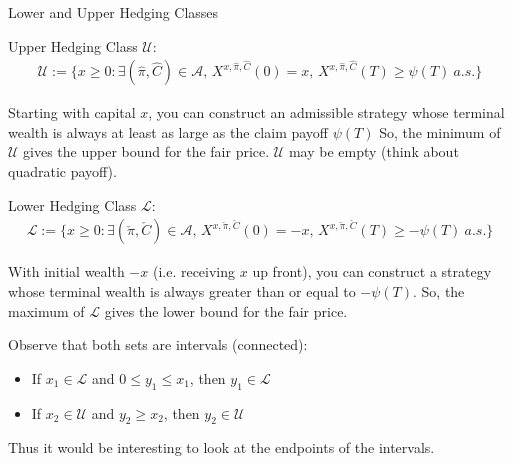 \documentclass{beamer}
\begin{document}
\begin{frame}{Lower and Upper Hedging Classes}

    {\footnotesize \footnotesize
    \par Upper Hedging Class $\mathcal{U}$:
    \begin{align*}
         \mathcal{U} := \{x \geq 0 : \exists (\hat{\pi}, \hat{C}) \in \mathcal{A}, \, X^{x,\hat{\pi},\hat{C}}(0)
          = x, \, X^{x,\hat{\pi},\hat{C}}(T) \geq \psi(T) \ a.s.\}
    \end{align*}
    \par Starting with capital $x$,
     you can construct an admissible strategy whose terminal wealth is always at least as large as the claim payoff $\psi(T)$
     So, the minimum of $\mathcal{U}$ gives the upper bound for the fair price. $\mathcal{U}$ may be empty (think about quadratic payoff).
     \vspace{1em}
     \par Lower Hedging Class $\mathcal{L}$:
     \begin{align*}
         \mathcal{L} := \{x \geq 0 : \exists (\check{\pi}, \check{C}) \in \mathcal{A}, \, X^{x,\check{\pi},\check{C}}(0) 
         = -x, \, X^{x,\check{\pi},\check{C}}(T) \geq -\psi(T) \ a.s.\}
     \end{align*}
     \par  With initial wealth $-x$ (i.e. receiving $x$ up front),
      you can construct a strategy whose terminal wealth is always greater than or equal to $-\psi(T)$. 
      So, the maximum of $\mathcal{L}$ gives the lower bound for the fair price.
      \vspace{1em}
      \par Observe that both sets are intervals (connected):
     \begin{itemize}
        \item If $x_1 \in \mathcal{L}$ and $0 \leq y_1 \leq x_1$, then $y_1 \in \mathcal{L}$
        \item If $x_2 \in \mathcal{U}$ and $y_2 \geq x_2$, then $y_2 \in \mathcal{U}$
    \end{itemize}
    \par Thus it would be interesting to look at the endpoints of the intervals.
    }
\end{frame} 
\end{document}
